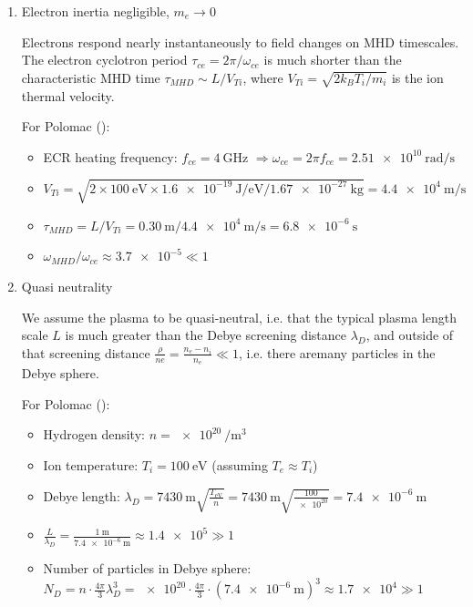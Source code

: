 \begin{enumerate}

\item Electron inertia negligible, $m_e \to 0$

Electrons respond nearly instantaneously to field changes on MHD timescales. 
The electron cyclotron period $\tau_{ce} = 2\pi/\omega_{ce}$ is much shorter 
than the characteristic MHD time $\tau_{MHD} \sim L/V_{Ti}$, where 
$V_{Ti} = \sqrt{2 k_B T_i / m_i}$ is the ion thermal velocity.

For Polomac (\cite{Elio2024}):
\begin{itemize}
    \item ECR heating frequency: $f_{ce} = \SI{4}{\giga\hertz}$ 
          $\Rightarrow \omega_{ce} = 2\pi f_{ce} = \SI{2.51e10}{\radian\per\second}$
    \item $V_{Ti} = \sqrt{2 \times \SI{100}{\electronvolt} \times \SI{1.6e-19}{\joule\per\electronvolt} / \SI{1.67e-27}{\kilo\gram}} = \SI{4.4e4}{\meter\per\second}$
    \item $\tau_{MHD} = L/V_{Ti} = \SI{0.30}{\meter} / \SI{4.4e4}{\meter\per\second} = \SI{6.8e-6}{\second}$
    \item $\omega_{MHD}/\omega_{ce} \approx \num{3.7e-5} \ll 1$
\end{itemize}




\item Quasi neutrality 

We assume the plasma to be quasi-neutral, i.e. that the typical plasma length scale $L$ is much greater than the Debye screening distance $\lambda_D$, and outside of that screening distance $\frac{\rho}{ne} = \frac{n_e - n_i}{n_e} \ll 1$, i.e. there aremany particles in the Debye sphere.

For Polomac (\cite{Elio2024}):
\begin{itemize}
    \item Hydrogen density: $n = \SI{e20}{\per\meter\cubed}$
    \item Ion temperature: $T_i = \SI{100}{\electronvolt}$ (assuming $T_e \approx T_i$)
    \item Debye length: $\lambda_D = \SI{7430}{\meter} \sqrt{\frac{T_{\text{eV}}}{n}} = \SI{7430}{\meter} \sqrt{\frac{100}{\num{e20}}} = \SI{7.4e-6}{\meter}$
    \item $\frac{L}{\lambda_D} = \frac{\SI{1}{\meter}}{\SI{7.4e-6}{\meter}} \approx \num{1.4e5} \gg 1$
    \item Number of particles in Debye sphere: $N_D = n \cdot \frac{4\pi}{3} \lambda_D^3 = \num{e20} \cdot \frac{4\pi}{3} \cdot (\SI{7.4e-6}{\meter})^3 \approx \num{1.7e4} \gg 1$ 
\end{itemize}


\end{enumerate}
